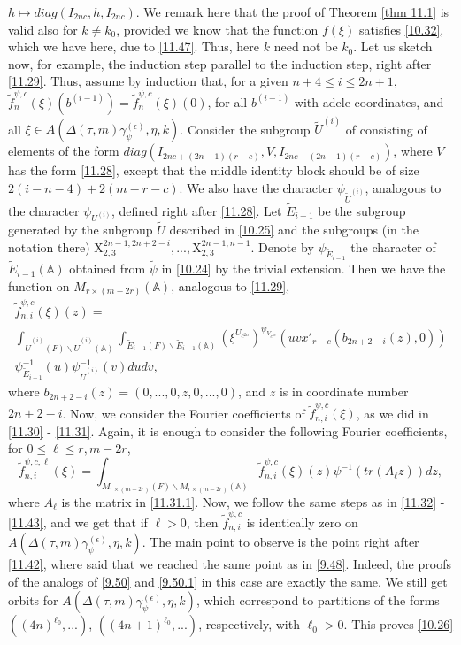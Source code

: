 \documentclass[12pts]{amsart}
\newcommand{\BA}{{\mathbb {A}}}
\begin{document}
$h\mapsto diag(I_{2nc},h,I_{2nc})$. We remark here that the proof of Theorem \ref{thm 11.1} is valid also for $k\neq k_0$, provided we know that the function $f(\xi)$ satisfies \eqref{10.32}, which we have here, due to \eqref{11.47}. Thus, here $k$ need not be $k_0$. Let us sketch now, for example, the induction step parallel to the induction step, right after \eqref{11.29}. Thus,
assume by induction that, for a given $n+4\leq i\leq 2n+1$, $\tilde{f}_n^{\psi,c}(\xi)(b^{(i-1)})=\tilde{f}_n^{\psi,c}(\xi)(0)$, for all $b^{(i-1)}$ with adele coordinates, and all $\xi\in A(\Delta(\tau,m)\gamma_\psi^{(\epsilon)},\eta,k)$. Consider the subgroup  $\tilde{U}^{(i)}$ of consisting of elements of the form $diag(I_{2nc+(2n-1)(r-c)},V, I_{2nc+(2n-1)(r-c)})$, where $V$ has the form \eqref{11.28}, except that the middle identity block should be of size $2(i-n-4)+2(m-r-c)$. We also have the character $\psi_{\tilde{U}^{(i)}}$, analogous to the character $\psi_{U^{(i)}}$, defined right after \eqref{11.28}. Let $\tilde{E}_{i-1}$ be the subgroup generated by the subgroup $\tilde{U}$ described in \eqref{10.25} and the subgroups (in the notation there) $\mathrm{X}_{2,3}^{2n-1,2n+2-i},...,\mathrm{X}_{2,3}^{2n-1,n-1}$. Denote by $\psi_{\tilde{E}_{i-1}}$ the character of $\tilde{E}_{i-1}(\BA)$ obtained from $\tilde{\psi}$ in \eqref{10.24} by the trivial extension. Then we have the function on $M_{r\times (m-2r)}(\BA)$, analogous to \eqref{11.29},
\begin{multline}\label{11.48}
 \tilde{f}_{n,i}^{\psi,c}(\xi)(z)=\\
\int_{\tilde{U}^{(i)}(F)\backslash
	\tilde{U}^{(i)}(\BA)}\int_{\tilde{E}_{i-1}(F)\backslash \tilde{E}_{i-1}(\BA)}(\xi^{U_{c^{2n}}})^{\psi_{V_{c^{2n}}}}(uvx'_{r-c}(b_{2n+2-i}(z),0))\\
	\psi^{-1}_{\tilde{E}_{i-1}}(u)\psi^{-1}_{\tilde{U}^{(i)}}(v)dudv,
\end{multline}
where $b_{2n+2-i}(z)=(0,...,0,z,0,...,0)$, and $z$ is in coordinate number $2n+2-i$. Now, we consider the Fourier coefficients of $ \tilde{f}_{n,i}^{\psi,c}(\xi)$, as we did in \eqref{11.30} -  \eqref{11.31}. Again, it is enough to consider the following Fourier coefficients, for $0\leq \ell\leq r, m-2r$,
\begin{equation}\label{11.49}
 \tilde{f}_{n,i}^{\psi,c,\ell}(\xi)=\int_{M_{r\times (m-2r)}(F)\backslash M_{r\times (m-2r)}(\BA)} \tilde{f}_{n,i}^{\psi,c}(\xi)(z)\psi^{-1}(tr(A_\ell z))dz,
\end{equation}
where $A_\ell$ is the matrix in \eqref{11.31.1}. Now, we follow the same steps as in \eqref{11.32} - \eqref{11.43}, and we get that if $\ell>0$, then $ \tilde{f}_{n,i}^{\psi,c}$ is identically zero on $A(\Delta(\tau,m)\gamma_\psi^{(\epsilon)},\eta,k)$. The main point to observe is the point right after \eqref{11.42}, where said that we reached the same point as in \eqref{9.48}. Indeed, the proofs of the analogs of \eqref{9.50} and \eqref{9.50.1} in this case are exactly the same. We still get orbits for $A(\Delta(\tau,m)\gamma_\psi^{(\epsilon)},\eta,k)$, which correspond to partitions of the forms $((4n)^{\ell_0},...)$, $((4n+1)^{\ell_0},...)$, respectively, with $\ell_0>0$. This proves \eqref{10.26}
\end{document}
